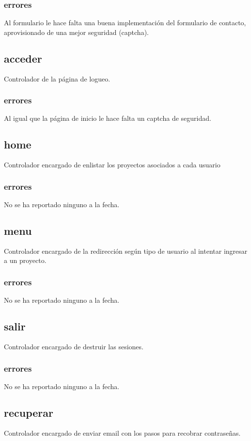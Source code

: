 \documentclass[10pt,a4paper]{book}
\begin{document}
	\subsubsection{errores} Al formulario le hace falta una buena implementación del formulario de contacto, aprovisionado de una mejor seguridad (captcha).
	
	
	\subsection{acceder} 
	Controlador de la página de logueo.
	
	\subsubsection{errores}
	Al igual que la página de inicio le hace falta un captcha de seguridad.
	
	\subsection{home}
	Controlador encargado de enlistar los proyectos asociados a cada usuario
	\subsubsection{errores}
	No se ha reportado ninguno a la fecha.
	
	\subsection{menu}
	Controlador encargado de la redirección según tipo de usuario al intentar ingresar a un proyecto.
	\subsubsection{errores}
	No se ha reportado ninguno a la fecha.
	
	\subsection{salir}
	Controlador encargado de destruir las sesiones.
	\subsubsection{errores}
	No se ha reportado ninguno a la fecha.
	
	\subsection{recuperar}\label{recuperar}
	Controlador encargado de enviar email con los pasos para recobrar contraseñas.
\end{document}
